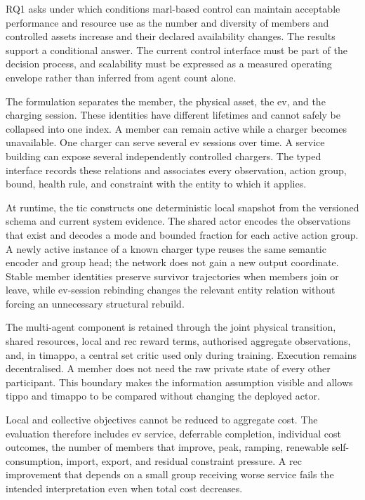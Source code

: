 RQ1 asks under which conditions \gls{marl}-based control can maintain acceptable performance and resource use as the number and diversity of members and controlled assets increase and their declared availability changes. The results support a conditional answer. The current control interface must be part of the decision process, and scalability must be expressed as a measured operating envelope rather than inferred from agent count alone.

The formulation separates the member, the physical asset, the \gls{ev}, and the charging session. These identities have different lifetimes and cannot safely be collapsed into one index. A member can remain active while a charger becomes unavailable. One charger can serve several \gls{ev} sessions over time. A service building can expose several independently controlled chargers. The typed interface records these relations and associates every observation, action group, bound, health rule, and constraint with the entity to which it applies.

At runtime, the \gls{tic} constructs one deterministic local snapshot from the versioned schema and current system evidence. The shared actor encodes the observations that exist and decodes a mode and bounded fraction for each active action group. A newly active instance of a known charger type reuses the same semantic encoder and group head; the network does not gain a new output coordinate. Stable member identities preserve survivor trajectories when members join or leave, while \gls{ev}-session rebinding changes the relevant entity relation without forcing an unnecessary structural rebuild.

The multi-agent component is retained through the joint physical transition, shared resources, local and \gls{rec} reward terms, authorised aggregate observations, and, in \gls{timappo}, a central set critic used only during training. Execution remains decentralised. A member does not need the raw private state of every other participant. This boundary makes the information assumption visible and allows \gls{tippo} and \gls{timappo} to be compared without changing the deployed actor.

Local and collective objectives cannot be reduced to aggregate cost. The evaluation therefore includes \gls{ev} service, deferrable completion, individual cost outcomes, the number of members that improve, peak, ramping, renewable self-consumption, import, export, and residual constraint pressure. A \gls{rec} improvement that depends on a small group receiving worse service fails the intended interpretation even when total cost decreases.

